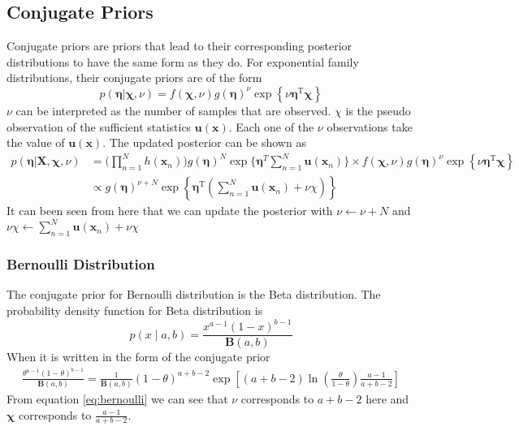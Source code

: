 \documentclass[12pt]{article}
\begin{document}
\subsection{Conjugate Priors}
Conjugate priors are priors that lead to their corresponding posterior distributions to have the same form as they do. 
For exponential family distributions, their conjugate priors are of the form 
\begin{equation}\label{eq:conjugate_prior}
    p(\boldsymbol{\eta} | \boldsymbol{\chi}, \nu)=f(\boldsymbol{\chi}, \nu) g(\boldsymbol{\eta})^{\nu} \exp \left\{\nu \boldsymbol{\eta}^{\mathrm{T}} \boldsymbol{\chi}\right\}
\end{equation}
$\nu$ can be interpreted as the number of samples that are observed. $\chi$ is the pseudo observation of the sufficient statistics $\textbf{u}(\textbf{x})$. Each one of the $\nu$ observations take the value of $\textbf{u}(\textbf{x})$.
The updated posterior can be shown as
\begin{equation}\label{eq:posterior}
\begin{split}
    p(\boldsymbol{\eta} | \mathbf{X}, \boldsymbol{\chi}, \nu) &=
    \Big(\prod_{n=1}^{N}h(\textbf{x}_n)\Big)g(\bm{\eta})^N\exp\Big\{\bm{\eta}^T\sum_{n=1}^N\textbf{u}(\textbf{x}_n)\Big\}\times f(\boldsymbol{\chi}, \nu) g(\boldsymbol{\eta})^{\nu} \exp \left\{\nu \boldsymbol{\eta}^{\mathrm{T}} \boldsymbol{\chi}\right\}\\
    &\propto
    g(\boldsymbol{\eta})^{\nu+N} \exp \left\{\boldsymbol{\eta}^{\mathrm{T}}\left(\sum_{n=1}^{N} \mathbf{u}\left(\mathbf{x}_{n}\right)+\nu \chi\right)\right\}
\end{split}
\end{equation}
It can been seen from here that we can update the posterior with $\nu \leftarrow \nu+N$ and $\nu\chi \leftarrow \sum_{n=1}^{N} \mathbf{u}\left(\mathbf{x}_{n}\right)+\nu \chi$
\subsubsection{Bernoulli Distribution}
The conjugate prior for Bernoulli distribution is the Beta distribution. The probability density function for Beta distribution is 
\begin{equation}\label{eq:beta}
    p(x\mid a,b)=\frac{x^{a-1}(1-x)^{b-1}}{\mathbf{B}(a, b)}
\end{equation}
When it is written in the form of the conjugate prior
\begin{equation}\label{eq:bernoulli}
\begin{split}
    \frac{\theta^{a-1}(1-\theta)^{b-1}}{\mathbf{B}(a, b)}
    =\frac{1}{\mathbf{B}(a, b)}(1-\theta)^{a+b-2}\exp[(a+b-2)\ln(\frac{\theta}{1-\theta})\frac{a-1}{a+b-2}]
\end{split}
\end{equation}
From equation \ref{eq:bernoulli} we can see that $\nu$ corresponds to $a+b-2$ here and $\bm{\chi}$ corresponds to $\frac{a-1}{a+b-2}$.
\end{document}
